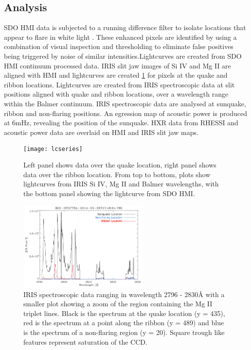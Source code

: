 \documentclass[11pt]{article}
\begin{document}
\subsection{Analysis}
SDO HMI data is subjected to a running difference filter to isolate locations that appear to flare in white light . These enhanced pixels are identified by using a combination of visual inspection and thresholding to eliminate false positives being triggered by noise of similar intensities.Lightcurves are created from SDO HMI continuum processed data. IRIS slit jaw images of Si IV and Mg II are aligned with HMI and lightcurves are created \ref{lcseries} for pixels at the quake and ribbon locations. Lightcurves are created from IRIS spectroscopic data at slit positions aligned with quake and ribbon locations, over a wavelength range within the Balmer continuum. IRIS spectroscopic data are analysed at sunquake, ribbon and non-flaring positions. An egression map of acoustic power is produced  at 6mHz, revealing the position of the sunquake. HXR data from RHESSI and acoustic power data are overlaid on HMI and IRIS slit jaw maps.\\

\begin{figure}\label{lcseries}
  \begin{center} 
\texttt{[image: lcseries]}
  \end{center}
  \caption{Left panel shows data over the quake location, right panel shows data over the ribbon location. From top to bottom, plots show lightcurves from IRIS Si IV, Mg II and Balmer wavelengths, with the bottom panel showing the lightcurve from SDO HMI. }
\end{figure}

\begin{figure}\label{spectra}
  \begin{center}
  \includegraphics[width=0.58\textwidth]{spectra}
  \end{center}
  \caption{IRIS spectroscopic data ranging in wavelength 2796 - 2830Å with a smaller plot showing a zoom of the region containing the Mg II triplet lines. Black is the spectrum at the quake location (y = 435), red is the spectrum at a point along the ribbon (y = 489) and blue is the spectrum of a non-flaring region (y = 20). Square trough like features represent saturation of the CCD.}
\end{figure}
 
\end{document}
